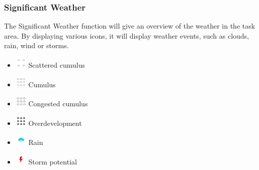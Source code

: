 \documentclass[11pt,a4paper]{article}
\begin{document}

\subsubsection{Significant Weather}\label{subsec:sigweather}
The Significant Weather function will give an overview of the weather in the task area. By displaying various icons, it will display weather events, such as clouds, rain, wind or storms.
\begin{itemize}
\item \includegraphics[height=15pt]{images/icons/cu-1.png} Scattered cumulus
\item \includegraphics[height=15pt]{images/icons/cu-2.png} Cumulus
\item \includegraphics[height=15pt]{images/icons/cu-od-3.png} Congested cumulus
\item \includegraphics[height=15pt]{images/icons/cu-od-4.png} Overdevelopment
\item \includegraphics[height=15pt]{images/icons/cu-rain-7.png} Rain
\item \includegraphics[height=15pt]{images/icons/cu-storm-6.png} Storm potential
\end{itemize}
\end{document}

